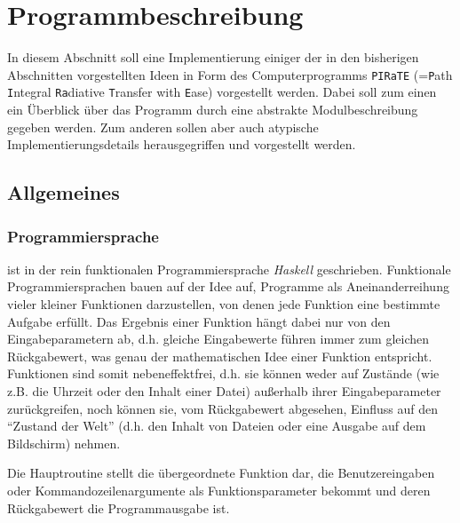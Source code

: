 	\chapter{Programmbeschreibung}\label{cha:program_description}
	In diesem Abschnitt soll eine Implementierung einiger der in den bisherigen Abschnitten vorgestellten Ideen in Form des Computerprogramms \texttt{PIRaTE} (=\texttt{P}ath \texttt{I}ntegral \texttt{Ra}diative \texttt{T}ransfer with \texttt{E}ase) vorgestellt werden. Dabei soll zum einen ein Überblick über das Programm durch eine abstrakte Modulbeschreibung gegeben werden. Zum anderen sollen aber auch atypische Implementierungsdetails herausgegriffen und vorgestellt werden.
	
	
	\section{Allgemeines}
	\subsection{Programmiersprache}
	\pirate ist in der rein funktionalen Programmiersprache {\em Haskell} geschrieben. Funktionale Programmiersprachen bauen auf der Idee auf, Programme als Aneinanderreihung vieler kleiner Funktionen darzustellen, von denen jede Funktion eine bestimmte Aufgabe erfüllt. Das Ergebnis einer Funktion hängt dabei nur von den Eingabeparametern ab, d.h. gleiche Eingabewerte führen immer zum gleichen Rückgabewert, was genau der mathematischen Idee einer Funktion entspricht. Funktionen sind somit nebeneffektfrei, d.h. sie können weder auf Zustände (wie z.B. die Uhrzeit oder den Inhalt einer Datei) außerhalb ihrer Eingabeparameter zurückgreifen, noch können sie, vom Rückgabewert abgesehen, Einfluss auf den ``Zustand der Welt'' (d.h. den Inhalt von Dateien oder eine Ausgabe auf dem Bildschirm) nehmen.
	
	Die Hauptroutine stellt die übergeordnete Funktion dar, die Benutzereingaben oder Kommandozeilenargumente als Funktionsparameter bekommt und deren Rückgabewert die Programmausgabe ist.
	
